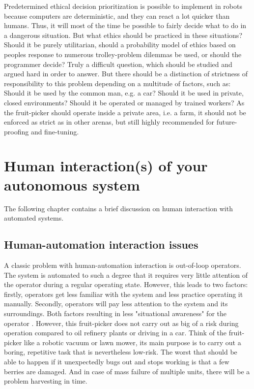 \documentclass[%
oneside,    %
project,    %
nosummary   %
]{USN-MSc}
\begin{document}
Predetermined ethical decision prioritization is possible to implement in robots because computers are deterministic, and they can react a lot quicker than humans. Thus, it will most of the time be possible to fairly decide what to do in a dangerous situation.
But what ethics should be practiced in these situations? Should it be purely utilitarian, should a probability model of ethics based on peoples response to numerous trolley-problem dilemmas be used, or should the programmer decide? Truly a difficult question, which should be studied and argued hard in order to answer. But there should be a distinction of strictness of responsibility to this problem depending on a multitude of factors, such as: Should it be used by the common man, e.g. a car? Should it be used in private, closed environments? Should it be operated or managed by trained workers? As the fruit-picker should operate inside a private area, i.e. a farm, it should not be enforced as strict as in other arenas, but still highly recommended for future-proofing and fine-tuning.

\chapter{Human interaction(s) of your autonomous system}
\label{ch:human}
The following chapter contains a brief discussion on human interaction with automated systems.
\section{Human-automation interaction issues}
\label{sec:humanAutomationIssues}
A classic problem with human-automation interaction is out-of-loop operators. The system is automated to such a degree that it requires very little attention of the operator during a regular operating state. However, this leads to two factors: firstly, operators get less familiar with the system and less practice operating it manually. Secondly, operators will pay less attention to the system and its surroundings. Both factors resulting in less "situational awareness" for the operator \cite{Gruhn2011HumanMI}. However, this fruit-picker does not carry out as big of a risk during operation compared to oil refinery plants or driving in a car. Think of the fruit-picker like a robotic vacuum or lawn mower, its main purpose is to carry out a boring, repetitive task that is nevertheless low-risk. The worst that should be able to happen if it unexpectedly bugs out and stops working is that a few berries are damaged. And in case of mass failure of multiple units, there will be a problem harvesting in time. \cite{NozzleWi94:online}
\end{document}
